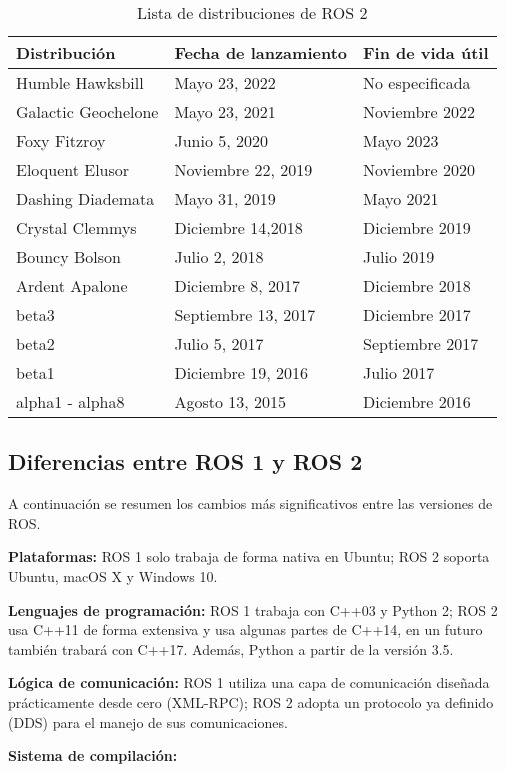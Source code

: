 \begin{table}
    \centering
    \begin{tabular}{||l|l|l||}
        \hline
        Distribución & Fecha de lanzamiento & Fin de vida útil\\
        \hline
        Humble Hawksbill & Mayo 23, 2022 & No especificada\\
        Galactic Geochelone & Mayo 23, 2021 & Noviembre 2022\\
        Foxy Fitzroy & Junio 5, 2020 & Mayo 2023\\
        Eloquent Elusor & Noviembre  22, 2019 & Noviembre 2020\\
        Dashing Diademata & Mayo 31, 2019 & Mayo 2021\\
        Crystal Clemmys & Diciembre 14,2018 & Diciembre 2019\\
        Bouncy Bolson & Julio 2, 2018 & Julio 2019\\
        Ardent Apalone & Diciembre 8, 2017 & Diciembre 2018\\
        beta3 & Septiembre 13, 2017 & Diciembre 2017\\
        beta2 & Julio 5, 2017 & Septiembre 2017\\
        beta1 & Diciembre 19, 2016 & Julio 2017\\
        alpha1 - alpha8 & Agosto 13, 2015 & Diciembre 2016\\
        \hline
    \end{tabular}
    \caption{Lista de distribuciones de ROS 2}
    \label{tab:rosd}
\end{table}

\subsection{Diferencias entre ROS 1 y ROS 2}
A continuación se resumen los cambios más significativos entre las versiones de ROS.

\textbf{Plataformas:} ROS 1 solo trabaja de forma nativa en Ubuntu; ROS 2 soporta Ubuntu, macOS X y Windows 10.

\textbf{Lenguajes de programación:} ROS 1 trabaja con C++03 y Python 2; ROS 2 usa C++11 de forma extensiva y usa algunas partes de C++14,  en un futuro también trabará con C++17. Además, Python a partir de la versión 3.5.

\textbf{Lógica de comunicación:} ROS 1 utiliza una capa de comunicación diseñada prácticamente desde cero (XML-RPC); ROS 2 adopta un protocolo ya definido (DDS) para el manejo de sus comunicaciones.

\textbf{Sistema de compilación:} 







